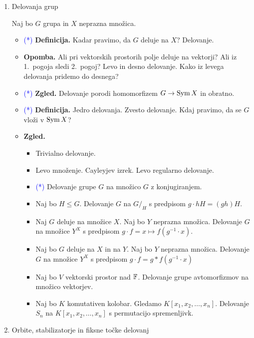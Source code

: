 \begin{enumerate}
\item Delovanja grup
    
    Naj bo \(G\) grupa in \(X\) neprazna množica.
    \begin{itemize}
        \item \textcolor{blue}{(*)} \textbf{Definicija.} Kadar pravimo, da \(G\) deluje na \(X\)? Delovanje.
        \item \textbf{Opomba.} Ali pri vektorskih prostorih polje deluje na vektorji? Ali iz 1.\ pogoja sledi 2.\ pogoj? Levo in desno delovanje. Kako iz levega delovanja pridemo do desnega?
        \item \textcolor{blue}{(*)} \textbf{Zgled.} Delovanje porodi homomorfizem \(G \to \operatorname{Sym} X\) in obratno.
        \item \textcolor{blue}{(*)} \textbf{Definicija.} Jedro delovanja. Zvesto delovanje. Kdaj pravimo, da se \(G\) vloži v \(\operatorname{Sym} X\)?
        \item \textbf{Zgled.} \
        \begin{itemize}
            \item Trivialno delovanje.
            \item Levo množenje. Cayleyjev izrek. Levo regularno delovanje.
            \item \textcolor{blue}{(*)} Delovanje grupe \(G\) na množico \(G\) z konjugiranjem.
            \item Naj bo \(H \leq G\). Delovanje \(G\) na \(G/_H\) s predpisom \(g \cdot hH = (gh)H\).
            \item Naj \(G\) deluje na množice \(X\). Naj bo \(Y\) neprazna množica. Delovanje \(G\) na množice \(Y^X\) s predpisom \(g \cdot f = x \mapsto f(g^{-1} \cdot x)\).
            \item Naj bo \(G\) deluje na \(X\) in na \(Y\). Naj bo \(Y\) neprazna množica. Delovanje \(G\) na množice \(Y^X\) s predpisom \(g \cdot f = g * f(g^{-1} \cdot x)\)
            \item Naj bo \(V\) vektorski prostor nad \(\mathbb{F}\). Delovanje grupe avtomorfizmov na množico vektorjev. 
            \item Naj bo \(K\) komutativen kolobar. Gledamo \(K[x_1, x_2, \ldots, x_n]\). Delovanje \(S_n\) na \(K[x_1, x_2, \ldots, x_n]\) s permutacijo spremenljivk.
        \end{itemize}        
    \end{itemize}

    \item Orbite, stabilizatorje in fiksne točke delovanj
    

\end{enumerate}
